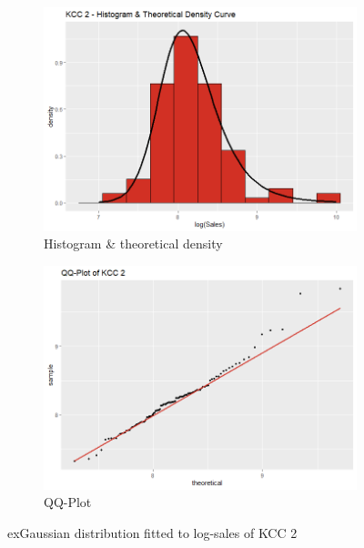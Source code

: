  \begin{figure}[H]
\centering
\begin{subfigure}{.45\textwidth}
  \centering
  \includegraphics[width=\linewidth]{figures/kcc_2_density.png}
  \caption{Histogram \& theoretical density}
  \label{fig:kcc_2_density}
\end{subfigure}
\begin{subfigure}{.45\textwidth}
  \centering
  \includegraphics[width=\linewidth]{figures/kcc_2_qqplot.png}
  \caption{QQ-Plot}
  \label{fig:kcc_2_qqplot}
\end{subfigure}
\caption{exGaussian distribution fitted to log-sales of \ac{KCC} 2}
\label{fig:kcc_2_marginal}
\end{figure} 




